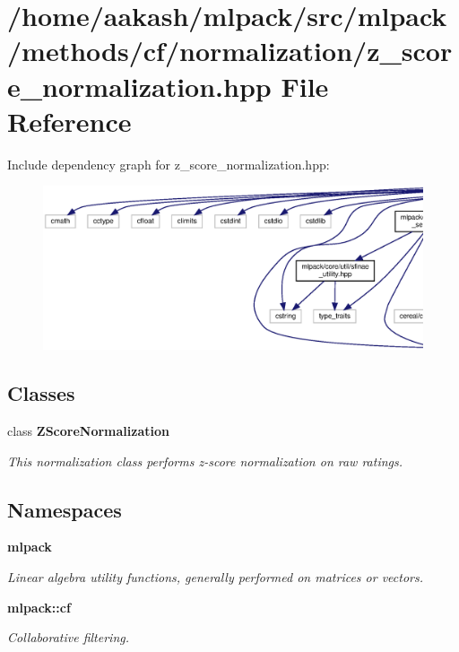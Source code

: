 \section{/home/aakash/mlpack/src/mlpack/methods/cf/normalization/z\+\_\+score\+\_\+normalization.hpp File Reference}
\label{z__score__normalization_8hpp}
Include dependency graph for z\+\_\+score\+\_\+normalization.\+hpp\+:
\nopagebreak
\begin{figure}[H]
\begin{center}
\leavevmode
\includegraphics[width=350pt]{z__score__normalization_8hpp__incl}
\end{center}
\end{figure}
\subsection*{Classes}
\begin{DoxyCompactItemize}
\item 
class \textbf{ Z\+Score\+Normalization}
\begin{DoxyCompactList}\small\item\em This normalization class performs z-\/score normalization on raw ratings. \end{DoxyCompactList}\end{DoxyCompactItemize}
\subsection*{Namespaces}
\begin{DoxyCompactItemize}
\item 
 \textbf{ mlpack}
\begin{DoxyCompactList}\small\item\em Linear algebra utility functions, generally performed on matrices or vectors. \end{DoxyCompactList}\item 
 \textbf{ mlpack\+::cf}
\begin{DoxyCompactList}\small\item\em Collaborative filtering. \end{DoxyCompactList}\end{DoxyCompactItemize}



